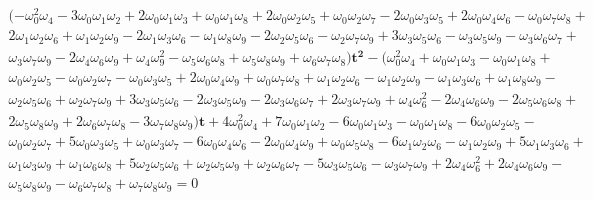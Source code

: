\documentclass[a4paper,10pt]{amsart}
\theoremstyle{plain}
\theoremstyle{definition}
\theoremstyle{remark}
\numberwithin{equation}{section}
\begin{document}
 \begin{gather*}
(-\omega_{0}^2\omega_{4} - 3\omega_{0}\omega_{1}\omega_{2} + 2\omega_{0}\omega_{1}\omega_{3} + \omega_{0}\omega_{1}\omega_{8} + 2\omega_{0}\omega_{2}\omega_{5} +
    \omega_{0}\omega_{2}\omega_{7} - 2\omega_{0}\omega_{3}\omega_{5} + 2\omega_{0}\omega_{4}\omega_{6} - 
\omega_{0}\omega_{7}\omega_{8} +\\
    2\omega_{1}\omega_{2}\omega_{6} + \omega_{1}\omega_{2}\omega_{9} - 2\omega_{1}\omega_{3}\omega_{6} - \omega_{1}\omega_{8}\omega_{9} -
    2\omega_{2}\omega_{5}\omega_{6} - \omega_{2}\omega_{7}\omega_{9} + 3\omega_{3}\omega_{5}\omega_{6} - \omega_{3}\omega_{5}\omega_{9} - \omega_{3}\omega_{6}\omega_{7} + \\
\omega_{3}\omega_{7}\omega_{9} - 2\omega_{4}\omega_{6}\omega_{9} + \omega_{4}\omega_{9}^2 - \omega_{5}\omega_{6}\omega_{8} + \omega_{5}\omega_{8}\omega_{9}
    + \omega_{6}\omega_{7}\omega_{8})\pmb{t^2} - (\omega_{0}^2\omega_{4} + \omega_{0}\omega_{1}\omega_{3} - \omega_{0}\omega_{1}\omega_{8} +\\ \omega_{0}\omega_{2}\omega_{5} - 
    \omega_{0}\omega_{2}\omega_{7} - \omega_{0}\omega_{3}\omega_{5} + 2\omega_{0}\omega_{4}\omega_{9} + \omega_{0}\omega_{7}\omega_{8} + \omega_{1}\omega_{2}\omega_{6} -
    \omega_{1}\omega_{2}\omega_{9} - \omega_{1}\omega_{3}\omega_{6} + \omega_{1}\omega_{8}\omega_{9} -\\ \omega_{2}\omega_{5}\omega_{6} + \omega_{2}\omega_{7}\omega_{9} +
    3\omega_{3}\omega_{5}\omega_{6} - 2\omega_{3}\omega_{5}\omega_{9} - 2\omega_{3}\omega_{6}\omega_{7} + 2\omega_{3}\omega_{7}\omega_{9} + \omega_{4}\omega_{6}^2 -
    2\omega_{4}\omega_{6}\omega_{9} - 2\omega_{5}\omega_{6}\omega_{8} +\\ 2\omega_{5}\omega_{8}\omega_{9} + 2\omega_{6}\omega_{7}\omega_{8} - 
3\omega_{7}\omega_{8}\omega_{9})\pmb{t} +
    4\omega_{0}^2\omega_{4} + 7\omega_{0}\omega_{1}\omega_{2} - 6\omega_{0}\omega_{1}\omega_{3} - \omega_{0}\omega_{1}\omega_{8} - 6\omega_{0}\omega_{2}\omega_{5} - \\ \omega_{0}\omega_{2}\omega_{7} +
    5\omega_{0}\omega_{3}\omega_{5} + \omega_{0}\omega_{3}\omega_{7} -
 6\omega_{0}\omega_{4}\omega_{6} - 2\omega_{0}\omega_{4}\omega_{9} + \omega_{0}\omega_{5}\omega_{8} - 6\omega_{1}\omega_{2}\omega_{6} -
    \omega_{1}\omega_{2}\omega_{9} + 5\omega_{1}\omega_{3}\omega_{6} +\\ \omega_{1}\omega_{3}\omega_{9} + \omega_{1}\omega_{6}\omega_{8} + 5\omega_{2}\omega_{5}\omega_{6} + \omega_{2}\omega_{5}\omega_{9} +
    \omega_{2}\omega_{6}\omega_{7} - 5\omega_{3}\omega_{5}\omega_{6} - \omega_{3}\omega_{7}\omega_{9} + 2\omega_{4}\omega_{6}^2 + 2\omega_{4}\omega_{6}\omega_{9} -\\ \omega_{5}\omega_{8}\omega_{9} -
    \omega_{6}\omega_{7}\omega_{8} + \omega_{7}\omega_{8}\omega_{9}=0
    \end{gather*}
\end{document}

